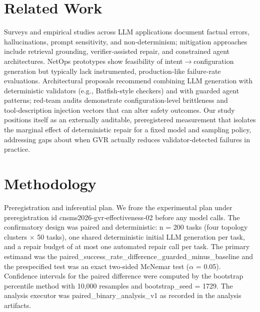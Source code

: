 \documentclass[conference]{IEEEtran}
\begin{document}
\section{Related Work}
Surveys and empirical studies across LLM applications document factual errors, hallucinations, prompt sensitivity, and non‑determinism; mitigation approaches include retrieval grounding, verifier‑assisted repair, and constrained agent architectures. NetOps prototypes show feasibility of intent\ensuremath{\rightarrow}configuration generation but typically lack instrumented, production‑like failure‑rate evaluations. Architectural proposals recommend combining LLM generation with deterministic validators (e.g., Batfish‑style checkers) and with guarded agent patterns; red‑team audits demonstrate configuration‑level brittleness and tool‑description injection vectors that can alter safety outcomes. Our study positions itself as an externally auditable, preregistered measurement that isolates the marginal effect of deterministic repair for a fixed model and sampling policy, addressing gaps about when GVR actually reduces validator‑detected failures in practice.

\section{Methodology}
Preregistration and inferential plan. We froze the experimental plan under preregistration id cnsms2026‑gvr‑effectiveness‑02 before any model calls. The confirmatory design was paired and deterministic: n = 200 tasks (four topology clusters \ensuremath{\times} 50 tasks), one shared deterministic initial LLM generation per task, and a repair budget of at most one automated repair call per task. The primary estimand was the paired\_success\_rate\_difference\_guarded\_minus\_baseline and the prespecified test was an exact two‑sided McNemar test (\ensuremath{\alpha} = 0.05). Confidence intervals for the paired difference were computed by the bootstrap percentile method with 10,000 resamples and bootstrap\_seed = 1729. The analysis executor was paired\_binary\_analysis\_v1 as recorded in the analysis artifacts.
\end{document}
